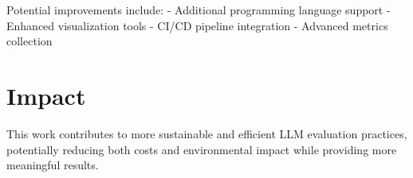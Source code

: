 Potential improvements include:
- Additional programming language support
- Enhanced visualization tools
- CI/CD pipeline integration
- Advanced metrics collection

\section{Impact}

This work contributes to more sustainable and efficient LLM evaluation practices, potentially reducing both costs and environmental impact while providing more meaningful results.
